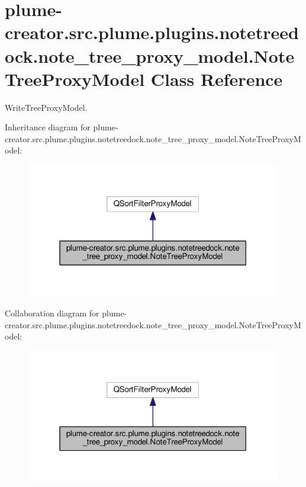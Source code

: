 \hypertarget{classplume-creator_1_1src_1_1plume_1_1plugins_1_1notetreedock_1_1note__tree__proxy__model_1_1_note_tree_proxy_model}{}\section{plume-\/creator.src.\+plume.\+plugins.\+notetreedock.\+note\+\_\+tree\+\_\+proxy\+\_\+model.\+Note\+Tree\+Proxy\+Model Class Reference}
\label{classplume-creator_1_1src_1_1plume_1_1plugins_1_1notetreedock_1_1note__tree__proxy__model_1_1_note_tree_proxy_model}


Write\+Tree\+Proxy\+Model.  




Inheritance diagram for plume-\/creator.src.\+plume.\+plugins.\+notetreedock.\+note\+\_\+tree\+\_\+proxy\+\_\+model.\+Note\+Tree\+Proxy\+Model\+:\nopagebreak
\begin{figure}[H]
\begin{center}
\leavevmode
\includegraphics[width=316pt]{classplume-creator_1_1src_1_1plume_1_1plugins_1_1notetreedock_1_1note__tree__proxy__model_1_1_nob45864da93d1f8277cda9b0ec95b6380}
\end{center}
\end{figure}


Collaboration diagram for plume-\/creator.src.\+plume.\+plugins.\+notetreedock.\+note\+\_\+tree\+\_\+proxy\+\_\+model.\+Note\+Tree\+Proxy\+Model\+:\nopagebreak
\begin{figure}[H]
\begin{center}
\leavevmode
\includegraphics[width=316pt]{classplume-creator_1_1src_1_1plume_1_1plugins_1_1notetreedock_1_1note__tree__proxy__model_1_1_no7f4bf24a1b6491f6a5bbbfae8577565b}
\end{center}
\end{figure}
